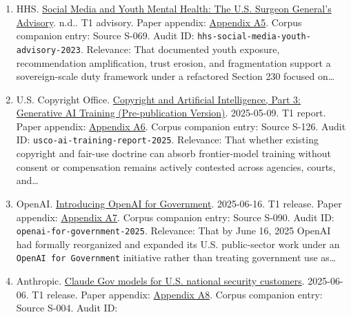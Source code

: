 \documentclass[
  american,
  11pt,
  letterpaper,
]{article}
\begin{document}
\begin{enumerate}
  platforms should be regulated on the basis of design, amplification,
  targeting, monetization, moderation architecture, and systemic reach
  rather than passiv\ldots{}
\item
  HHS.
  \href{https://www.hhs.gov/surgeongeneral/priorities/youth-mental-health/social-media/index.html}{Social
  Media and Youth Mental Health: The U.S. Surgeon General's Advisory}.
  n.d.. T1 advisory. Paper appendix:
  \hyperref[ch-10-appendix-a5-social-media-and-youth-mental-health-the-u-s-surgeon-general-s-advisory]{Appendix
  A5}. Corpus companion entry: Source S-069. Audit ID:
  \texttt{hhs-social-media-youth-advisory-2023}. Relevance: That
  documented youth exposure, recommendation amplification, trust
  erosion, and fragmentation support a sovereign-scale duty framework
  under a refactored Section 230 focused on\ldots{}
\item
  U.S. Copyright Office.
  \href{https://copyright.gov/ai/Copyright-and-Artificial-Intelligence-Part-3-Generative-AI-Training-Report-Pre-Publication-Version.pdf}{Copyright
  and Artificial Intelligence, Part 3: Generative AI Training
  (Pre-publication Version)}. 2025-05-09. T1 report. Paper appendix:
  \hyperref[ch-10-appendix-a6-copyright-and-artificial-intelligence-part-3-generative-ai-training-pre-publication-version]{Appendix
  A6}. Corpus companion entry: Source S-126. Audit ID:
  \texttt{usco-ai-training-report-2025}. Relevance: That whether
  existing copyright and fair-use doctrine can absorb frontier-model
  training without consent or compensation remains actively contested
  across agencies, courts, and\ldots{}
\item
  OpenAI.
  \href{https://openai.com/global-affairs/introducing-openai-for-government/}{Introducing
  OpenAI for Government}. 2025-06-16. T1 release. Paper appendix:
  \hyperref[ch-10-appendix-a7-introducing-openai-for-government]{Appendix
  A7}. Corpus companion entry: Source S-090. Audit ID:
  \texttt{openai-for-government-2025}. Relevance: That by June 16, 2025
  OpenAI had formally reorganized and expanded its U.S. public-sector
  work under an \texttt{OpenAI\ for\ Government} initiative rather than
  treating government use as\ldots{}
\item
  Anthropic.
  \href{https://www.anthropic.com/news/claude-gov-models-for-u-s-national-security-customers}{Claude
  Gov models for U.S. national security customers}. 2025-06-06. T1
  release. Paper appendix:
  \hyperref[ch-10-appendix-a8-claude-gov-models-for-u-s-national-security-customers]{Appendix
  A8}. Corpus companion entry: Source S-004. Audit ID:

\end{enumerate}
\end{document}
